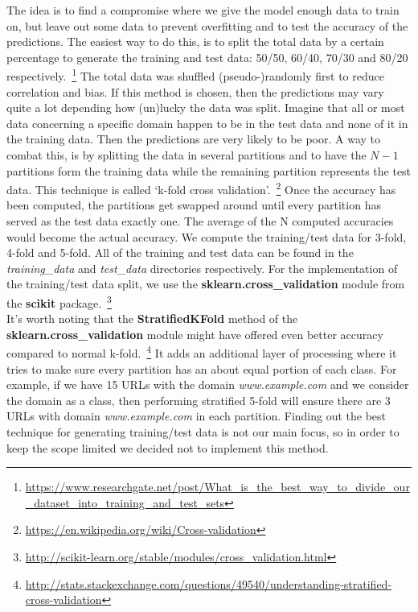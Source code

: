 The idea is to find a compromise where we give the model enough data to train on, but leave out some data to prevent overfitting and to test the accuracy of the predictions. The easiest way to do this, is to split the total data by a certain percentage to generate the training and test data: 50/50, 60/40, 70/30 and 80/20 respectively.~\footnote{\url{https://www.researchgate.net/post/What_is_the_best_way_to_divide_our_dataset_into_training_and_test_sets}} The total data was shuffled (pseudo-)randomly first to reduce correlation and bias. If this method is chosen, then the predictions may vary quite a lot depending how (un)lucky the data was split. Imagine that all or most data concerning a specific domain happen to be in the test data and none of it in the training data. Then the predictions are very likely to be poor. A way to combat this, is by splitting the data in several partitions and to have the $N-1$ partitions form the training data while the remaining partition represents the test data. This technique is called `k-fold cross validation'.~\footnote{\url{https://en.wikipedia.org/wiki/Cross-validation}} Once the accuracy has been computed, the partitions get swapped around until every partition has served as the test data exactly one. The average of the N computed accuracies would become the actual accuracy. We compute the training/test data for 3-fold, 4-fold and 5-fold. All of the training and test data can be found in the \textit{training\_data} and \textit{test\_data} directories respectively. For the implementation of the training/test data split, we use the \textbf{sklearn.cross\_validation} module from the \textbf{scikit} package.~\footnote{\url{http://scikit-learn.org/stable/modules/cross_validation.html}}
\\[2ex]
It's worth noting that the \textbf{StratifiedKFold} method of the \textbf{sklearn.cross\_validation} module might have offered even better accuracy compared to normal k-fold.~\footnote{\url{http://stats.stackexchange.com/questions/49540/understanding-stratified-cross-validation}} It adds an additional layer of processing where it tries to make sure every partition has an about equal portion of each class. For example, if we have 15 URLs with the domain \textit{www.example.com} and we consider the domain as a class, then performing stratified 5-fold will ensure there are 3 URLs with domain \textit{www.example.com} in each partition. Finding out the best technique for generating training/test data is not our main focus, so in order to keep the scope limited we decided not to implement this method.